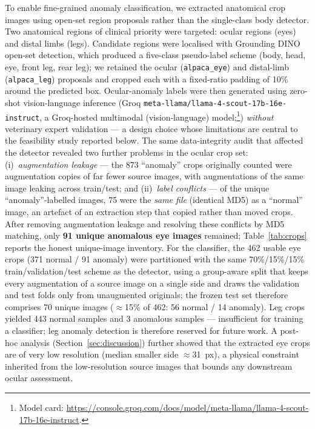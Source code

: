 \documentclass[journal=animals,article=article,submit=mdpi,moreauthors=true,pdftex]{mdpi}
\begin{document}
To enable fine-grained anomaly classification, we extracted anatomical crop images
using open-set region proposals rather than the single-class body detector.
Two anatomical regions of clinical priority were targeted: ocular regions (eyes) and
distal limbs (legs). Candidate regions were localised with Grounding
DINO~\cite{liu2023grounding} open-set detection, which produced a five-class pseudo-label
scheme (body, head, eye, front leg, rear leg); we retained the ocular
(\texttt{alpaca\_eye}) and distal-limb (\texttt{alpaca\_leg}) proposals and cropped each
with a fixed-ratio padding of 10\% around the predicted box.
Ocular-anomaly labels were then generated using zero-shot vision-language inference
(Groq \texttt{meta-llama/llama-4-scout-17b-16e-instruct}, a Groq-hosted multimodal
(vision-language) model;\footnote{Model card:
\url{https://console.groq.com/docs/model/meta-llama/llama-4-scout-17b-16e-instruct}.})
\emph{without} veterinary expert validation ---
a design choice whose limitations are central to the feasibility study reported below.
The same data-integrity audit that affected the detector revealed two further problems in
the ocular crop set: (i)~\emph{augmentation leakage} --- the 873 ``anomaly'' crops originally
counted were augmentation copies of far fewer source images, with augmentations of the same
image leaking across train/test; and (ii)~\emph{label conflicts} --- of the unique
``anomaly''-labelled images, 75 were the \emph{same file} (identical MD5) as a ``normal''
image, an artefact of an extraction step that copied rather than moved crops.
After removing augmentation leakage and resolving these conflicts by MD5 matching, only
\textbf{91 unique anomalous eye images} remained; Table~\ref{tab:crops} reports the honest
unique-image inventory.
For the classifier, the 462 usable eye crops (371 normal / 91 anomaly) were partitioned
with the same 70\%/15\%/15\% train/validation/test scheme as the detector, using a
group-aware split that keeps every augmentation of a source image on a single side and
draws the validation and test folds only from unaugmented originals; the frozen test set
therefore comprises 70 unique images ($\approx$15\% of 462: 56 normal / 14 anomaly).
Leg crops yielded 443 normal samples and 3 anomalous samples --- insufficient for
training a classifier; leg anomaly detection is therefore reserved for future work.
A post-hoc analysis (Section~\ref{sec:discussion}) further showed that the extracted eye
crops are of very low resolution (median smaller side $\approx$31~px), a physical
constraint inherited from the low-resolution source images that bounds any downstream
ocular assessment.
\end{document}
